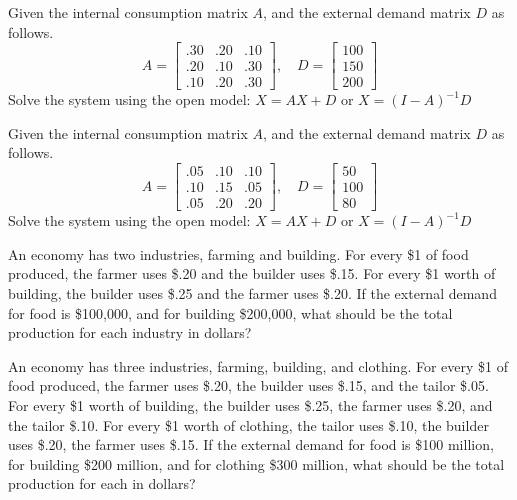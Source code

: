 \begin{puzzle}
    Given the internal consumption matrix \( A \), and the external demand matrix \( D \) as follows.
    \[
        A = \begin{bmatrix}
            .30 & .20 & .10 \\
            .20 & .10 & .30 \\
            .10 & .20 & .30
        \end{bmatrix}, \quad
        D = \begin{bmatrix}
            100 \\
            150 \\
            200
        \end{bmatrix}
    \]
    Solve the system using the open model: \( X = AX + D \) or \( X = (I - A)^{-1}D \)
\end{puzzle}

\begin{puzzle}
    Given the internal consumption matrix \( A \), and the external demand matrix \( D \) as follows.
    \[
        A = \begin{bmatrix}
            .05 & .10 & .10 \\
            .10 & .15 & .05 \\
            .05 & .20 & .20
        \end{bmatrix}, \quad
        D = \begin{bmatrix}
            50  \\
            100 \\
            80
        \end{bmatrix}
    \]
    Solve the system using the open model: \( X = AX + D \) or \( X = (I - A)^{-1}D \)
\end{puzzle}

\begin{puzzle}
    An economy has two industries, farming and building. For every \$1 of food produced, the farmer
    uses \$.20 and the builder uses \$.15. For every \$1 worth of building, the builder uses \$.25 and the
    farmer uses \$.20. If the external demand for food is \$100,000, and for building \$200,000, what
    should be the total production for each industry in dollars?

\end{puzzle}

\begin{puzzle}
    An economy has three industries, farming, building, and clothing. For every \$1 of food produced,
    the farmer uses \$.20, the builder uses \$.15, and the tailor \$.05. For every \$1 worth of building,
    the builder uses \$.25, the farmer uses \$.20, and the tailor \$.10. For every \$1 worth of clothing,
    the tailor uses \$.10, the builder uses \$.20, the farmer uses \$.15. If the external demand for food
    is \$100 million, for building \$200 million, and for clothing \$300 million, what should be the total
    production for each in dollars?

\end{puzzle}

